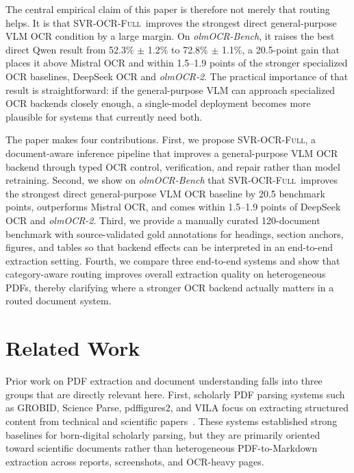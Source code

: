 \documentclass[conference]{IEEEtran}
\newcommand{\papername}[1]{\textit{#1}}
\newcommand{\svrocr}{\textsc{SVR-OCR-Full}}
\newcommand{\olmocr}{\papername{olmOCR-2}}
\begin{document}
The central empirical claim of this paper is therefore not merely that routing helps. It is that \svrocr\ improves the strongest direct general-purpose VLM OCR condition by a large margin. On \papername{olmOCR-Bench}, it raises the best direct Qwen result from 52.3\% $\pm$ 1.2\% to 72.8\% $\pm$ 1.1\%, a 20.5-point gain that places it above Mistral OCR and within 1.5--1.9 points of the stronger specialized OCR baselines, DeepSeek OCR and \olmocr. The practical importance of that result is straightforward: if the general-purpose VLM can approach specialized OCR backends closely enough, a single-model deployment becomes more plausible for systems that currently need both.

The paper makes four contributions. First, we propose \svrocr, a document-aware inference pipeline that improves a general-purpose VLM OCR backend through typed OCR control, verification, and repair rather than model retraining. Second, we show on \papername{olmOCR-Bench} that \svrocr\ improves the strongest direct general-purpose VLM OCR baseline by 20.5 benchmark points, outperforms Mistral OCR, and comes within 1.5--1.9 points of DeepSeek OCR and \olmocr. Third, we provide a manually curated 120-document benchmark with source-validated gold annotations for headings, section anchors, figures, and tables so that backend effects can be interpreted in an end-to-end extraction setting. Fourth, we compare three end-to-end systems and show that category-aware routing improves overall extraction quality on heterogeneous PDFs, thereby clarifying where a stronger OCR backend actually matters in a routed document system.

\section{Related Work}

Prior work on PDF extraction and document understanding falls into three groups that are directly relevant here. First, scholarly PDF parsing systems such as GROBID, Science Parse, pdffigures2, and VILA focus on extracting structured content from technical and scientific papers~\cite{grobid,scienceparse,pdffigures2,vila}. These systems established strong baselines for born-digital scholarly parsing, but they are primarily oriented toward scientific documents rather than heterogeneous PDF-to-Markdown extraction across reports, screenshots, and OCR-heavy pages.
\end{document}
